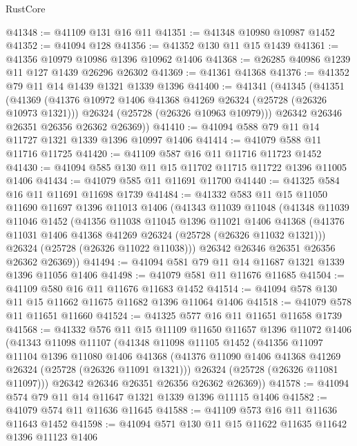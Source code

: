 \begin{lexlean}{RustCore}
\begin{coremodule}
@41348 := @41109 @131 @16 @11
@41351 := @41348 @10980 @10987 @1452
@41352 := @41094 @128
@41356 := @41352 @130 @11 @15 @1439
@41361 := @41356 @10979 @10986 @1396 @10962 @1406
@41368 := @26285 @40986 @1239 @11 @127 @1439 @26296 @26302
@41369 := @41361 @41368
@41376 := @41352 @79 @11 @14 @1439 @1321 @1339 @1396
@41400 := @41341
    (@41345
      (@41351
        (@41369
          (@41376 @10972 @1406 @41368 @41269 @26324 (@25728 (@26326 @10973 @1321)))
          @26324
          (@25728 (@26326 @10963 @10979)))
        @26342
        @26346
        @26351
        @26356
        @26362
        @26369))
@41410 := @41094 @588 @79 @11 @14 @11727 @1321 @1339 @1396 @10997 @1406
@41414 := @41079 @588 @11 @11716 @11725
@41420 := @41109 @587 @16 @11 @11716 @11723 @1452
@41430 := @41094 @585 @130 @11 @15 @11702 @11715 @11722 @1396 @11005 @1406
@41434 := @41079 @585 @11 @11691 @11700
@41440 := @41325 @584 @16 @11 @11691 @11698 @1739
@41484 := @41332
    @583
    @11
    @15
    @11050
    @11690
    @11697
    @1396
    @11013
    @1406
    (@41343
      @11039
      @11048
      (@41348
        @11039
        @11046
        @1452
        (@41356
          @11038
          @11045
          @1396
          @11021
          @1406
          @41368
          (@41376 @11031 @1406 @41368 @41269 @26324 (@25728 (@26326 @11032 @1321)))
          @26324
          (@25728 (@26326 @11022 @11038)))
        @26342
        @26346
        @26351
        @26356
        @26362
        @26369))
@41494 := @41094 @581 @79 @11 @14 @11687 @1321 @1339 @1396 @11056 @1406
@41498 := @41079 @581 @11 @11676 @11685
@41504 := @41109 @580 @16 @11 @11676 @11683 @1452
@41514 := @41094 @578 @130 @11 @15 @11662 @11675 @11682 @1396 @11064 @1406
@41518 := @41079 @578 @11 @11651 @11660
@41524 := @41325 @577 @16 @11 @11651 @11658 @1739
@41568 := @41332
    @576
    @11
    @15
    @11109
    @11650
    @11657
    @1396
    @11072
    @1406
    (@41343
      @11098
      @11107
      (@41348
        @11098
        @11105
        @1452
        (@41356
          @11097
          @11104
          @1396
          @11080
          @1406
          @41368
          (@41376 @11090 @1406 @41368 @41269 @26324 (@25728 (@26326 @11091 @1321)))
          @26324
          (@25728 (@26326 @11081 @11097)))
        @26342
        @26346
        @26351
        @26356
        @26362
        @26369))
@41578 := @41094 @574 @79 @11 @14 @11647 @1321 @1339 @1396 @11115 @1406
@41582 := @41079 @574 @11 @11636 @11645
@41588 := @41109 @573 @16 @11 @11636 @11643 @1452
@41598 := @41094 @571 @130 @11 @15 @11622 @11635 @11642 @1396 @11123 @1406

\end{coremodule}
\end{lexlean}
